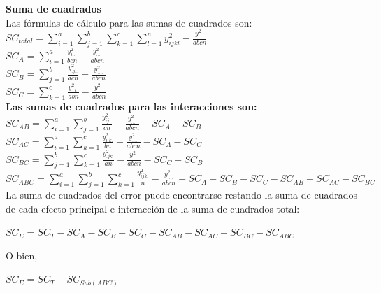 \textbf{Suma de cuadrados}\\
Las fórmulas de cálculo para las sumas de cuadrados son:\\
$ SC_{total} = \sum_{i=1}^{a}  \sum_{j=1}^{b}  \sum_{k=1}^{c}  \sum_{l=1}^{n} y_{ijkl}^{2} - \frac{y_{....}^{2}}{abcn} $\\

$ SC_{A} = \sum_{i=1}^{a} \frac{y_{i...}^{2}}{bcn}  - \frac{y_{....}^{2}}{abcn} $\\

$ SC_{B} = \sum_{j=1}^{b} \frac{y_{.j..}^{2}}{acn}  - \frac{y_{....}^{2}}{abcn} $\\

$ SC_{C} = \sum_{k=1}^{c} \frac{y_{..k.}^{2}}{abn} - \frac{y_{....}^{2}}{abcn} $\\


\textbf{Las sumas de cuadrados para las interacciones son:}\\

$ SC_{AB} = \sum_{i=1}^{a} \sum_{j=1}^{b}  \frac{y_{ij..}^{2}}{cn}  - \frac{y_{....}^{2}}{abcn} - SC_{A} -SC_{B}  $\\

$ SC_{AC} = \sum_{i=1}^{a} \sum_{k=1}^{c}  \frac{y_{i.k.}^{2}}{bn}  - \frac{y_{....}^{2}}{abcn} - SC_{A} -SC_{C}  $\\

$ SC_{BC} = \sum_{j=1}^{b} \sum_{k=1}^{c}  \frac{y_{.jk.}^{2}}{an}  - \frac{y_{....}^{2}}{abcn} - SC_{C} -SC_{B}  $\\


$ SC_{ABC} =  \sum_{i=1}^{a}  \sum_{j=1}^{b}  \sum_{k=1}^{c}  \frac{y_{ijk.}^{2}}{n}  - \frac{y_{....}^{2}}{abcn} - SC_{A} -SC_{B} - SC_{C} -SC_{AB} -SC_{AC} -SC_{BC}  $\\


La suma de cuadrados del error puede encontrarse restando la suma de cuadrados de cada efecto principal e interacción de la suma de cuadrados total:\\

\begin{center}
	$ SC_{E} = SC_{T} -SC_{A} - SC_{B}-SC_{C} -SC_{AB} -SC_{AC} -SC_{BC} -SC_{ABC} $\\
\end{center}

O bien,
\begin{center}
	$ SC_{E} = SC_{T} - SC_{Sub(ABC)} $\\
\end{center}

